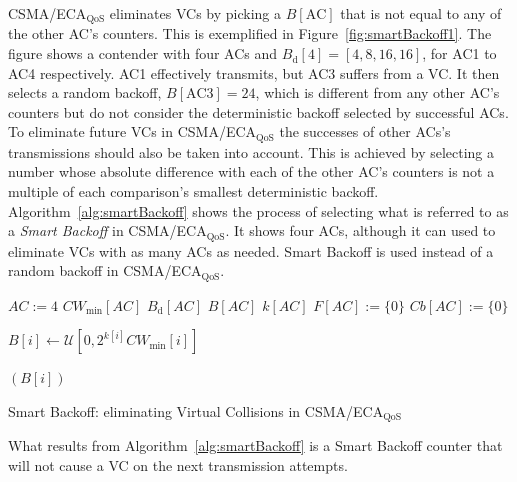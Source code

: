 CSMA/ECA$_{\text{QoS}}$ eliminates VCs by picking a $B[\text{AC}]$ that is not equal to any of the other AC's counters. This is exemplified in Figure~\ref{fig:smartBackoff1}. The figure shows a contender with four ACs and $B_{\text{d}}[4]=[4,8,16,16]$, for AC1 to AC4 respectively. AC1 effectively transmits, but AC3 suffers from a VC. It then selects a random backoff, $B[\text{AC3}]=24$, which is different from any other AC's counters but do not consider the deterministic backoff selected by successful ACs. To eliminate future VCs in CSMA/ECA$_{\text{QoS}}$ the successes of other ACs's transmissions should also be taken into account. This is achieved by selecting a number whose absolute difference with each of the other AC's counters is not a multiple of each comparison's smallest deterministic backoff. Algorithm~\ref{alg:smartBackoff} shows the process of selecting what is referred to as a \emph{Smart Backoff} in CSMA/ECA$_{\text{QoS}}$. It shows four ACs, although it can used to eliminate VCs with as many ACs as needed. Smart Backoff is used instead of a random backoff in CSMA/ECA$_{\text{QoS}}$.


	\begin{algorithm}[t]
		$AC:=4$
		$CW_{\min}[AC]$
		$B_{\text{d}}[AC]$
		$B[AC]$
		$k[AC]$
		$F[AC]:=\{0\}$\;
		$Cb[AC]:=\{0\}$\;
		\tcp{}\tcp{}
		{
			$B[i]\gets\mathcal{U}[0,2^{k[i]}{CW_{\min}[i]}]$\;
			{
			}
			
			
		}
		\Return $(B[i])$\;
		\vspace{0.2cm}
		\caption{Smart Backoff: eliminating Virtual Collisions in CSMA/ECA$_{\text{QoS}}$}
		\label{alg:smartBackoff}
	\end{algorithm}

What results from Algorithm~\ref{alg:smartBackoff} is a Smart Backoff counter that will not cause a VC on the next transmission attempts.

